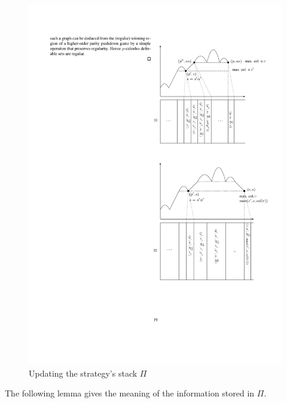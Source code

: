 \begin{figure}
\begin{center}

\includegraphics{./pile_update.pdf}
\caption{Updating the strategy's stack $\Pi$}\label{10-fig:mise_a_jour_pile_strategie}
\end{center}
\end{figure}

The following lemma gives the meaning of the information stored
in $\Pi$.


